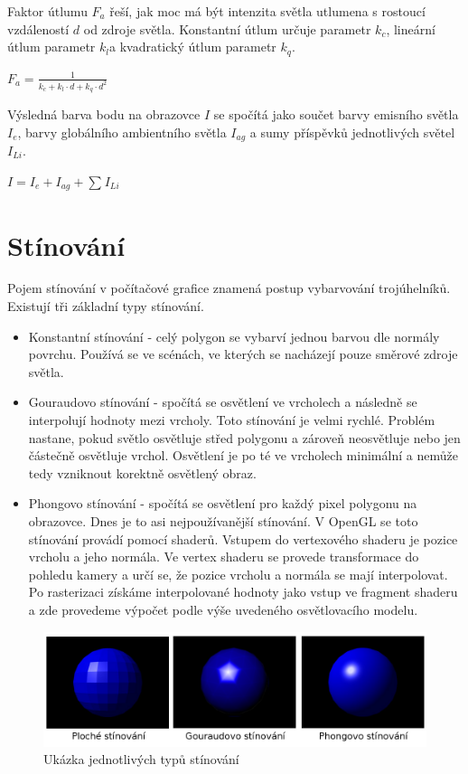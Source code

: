 \documentclass[11pt,twoside,a4paper]{book}
\begin{document}
Faktor útlumu $F_a$ řeší, jak moc má být intenzita světla utlumena s rostoucí vzdáleností $d$ od zdroje světla. Konstantní útlum určuje parametr $k_c$, lineární útlum parametr $k_l$\linebreak a kvadratický útlum parametr $k_q$.
\begin{center}
$F_a = \frac{1}{k_c + k_l \cdot d + k_q \cdot d^2}$
\end{center}
\bigskip

Výsledná barva bodu na obrazovce $I$ se spočítá jako součet barvy emisního světla $I_e$, barvy globálního ambientního světla $I_{ag}$ a sumy příspěvků jednotlivých světel $I_{Li}$.
\begin{center}
$I = I_e + I_{ag} + \sum_{}{} I_{Li}$
\end{center}

\section{Stínování}
Pojem stínování v počítačové grafice znamená postup vybarvování trojúhelníků. Existují tři základní typy stínování.
\begin{itemize}
\item Konstantní stínování - celý polygon se vybarví jednou barvou dle normály povrchu. Používá se ve scénách, ve kterých se nacházejí pouze směrové zdroje světla.
\item Gouraudovo stínování - spočítá se osvětlení ve vrcholech a následně se interpolují hodnoty mezi vrcholy. Toto stínování je velmi rychlé. Problém nastane, pokud světlo osvětluje střed polygonu a zároveň neosvětluje nebo jen částečně osvětluje vrchol. Osvětlení je po té ve vrcholech minimální a nemůže tedy vzniknout korektně osvětlený obraz.
\item Phongovo stínování - spočítá se osvětlení pro každý pixel polygonu na obrazovce. Dnes je to asi nejpoužívanější stínování. V OpenGL se toto stínování provádí pomocí shaderů. Vstupem do vertexového shaderu je pozice vrcholu a jeho normála. Ve vertex shaderu se provede transformace do pohledu kamery a určí se, že pozice vrcholu a normála se mají interpolovat. Po rasterizaci získáme interpolované hodnoty jako vstup ve fragment shaderu a zde provedeme výpočet podle výše uvedeného osvětlovacího modelu.
\end{itemize}

\begin{center}
\begin{figure}[h]
\includegraphics[width=135mm]{figures/shading.png}
\caption{Ukázka jednotlivých typů stínování}
\end{figure}
\end{center}
\end{document}
